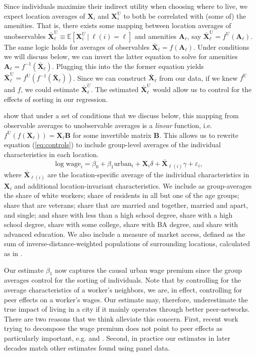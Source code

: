 \documentclass[12pt]{article}
\begin{document}
Since individuals maximize their indirect utility when choosing where to live, we expect location averages of $\bm{X}_i$ and $\bm{X}_i^\text{U}$ to both be correlated with (some of) the amenities.
That is, there exists some mapping between location averages of unobservables $\bar{\bm{X}}_\ell^\text{U} \equiv \mathbb{E}\left[ \bm{X}_i^U \ \vert \ \ell(i) = \ell \right]$ and amenities $\bm{A}_\ell$, say $\bar{\bm{X}}_\ell^\text{U} = f^{\text{U}}(\bm{A}_\ell)$. 
The same logic holds for averages of observables $\bar{\bm{X}}_\ell = f(\bm{A}_\ell)$. 
Under conditions we will discuss below, we can invert the latter equation to solve for amenities $\bm{A}_\ell = f^{-1}(\bar{\bm{X}}_\ell)$.
Plugging this into the the former equation yields $\bar{\bm{X}}_\ell^{\text{U}} = f^{\text{U}}(f^{-1}(\bar{\bm{X}}_\ell))$.
Since we can construct $\bar{\bm{X}}_\ell$ from our data, if we knew $f^{\text{U}}$ and $f$, we could estimate $\bar{\bm{X}}_\ell^U$. 
The estimated $\bar{\bm{X}}_\ell^U$ would allow us to control for the effects of sorting in our regression. 

\citet{altonji2018estimating} show that under a set of conditions that we discuss below, this mapping from observable averages to unobservable averages is a \emph{linear} function, 
i.e. $f^{\text{U}}(f( \bm{X}_\ell )) = \bm{X}_{\ell} \bm{B}$ for some invertible matrix $\bm{B}$. 
This allows us to rewrite equation (\ref{eq:controls}) to include group-level averages of the individual characteristics in each location.
\begin{equation}
    \label{eq:AM}
    \log \text{wage}_i = \beta_0 + \beta_1 \text{urban}_i + \bm{X}_{i} \delta + \bar{\bm{X}}_{\ell(i)}\gamma + \varepsilon_i,
\end{equation} 
where $\bar{\bm{X}}_{\ell(i)}$ are the location-specific average of the individual characteristics in $\bm{X}_i$ and additional location-invariant characteristics.
We include as group-averages the share of white workers; share of residents in all but one of the age groups; share that are veterans; share that are married and together, married and apart, and single; and share with less than a high school degree, share with a high school degree, share with some college, share with BA degree, and share with advanced education.
We also include a measure of market access, defined as the sum of inverse-distance-weighted populations of surrounding locations, calculated as in \citet{Jaworski_Kitchens_2019}.

Our estimate $\beta_1$ now captures the causal urban wage premium since the group averages control for the sorting of individuals.
Note that by controlling for the average characteristics of a worker's neighbors, we are, in effect, controlling for peer effects on a worker's wages. 
Our estimate may, therefore, underestimate the true impact of living in a city if it mainly operates through better peer-networks. 
There are two reasons that we think alleviate this concern. 
First, recent work trying to decompose the wage premium does not point to peer effects as particularly important, e.g. \citet*{card2024location} and \citet*{adenbaum2025there}.
Second, in practice our estimates in later decades match other estimates found using panel data.
\end{document}
